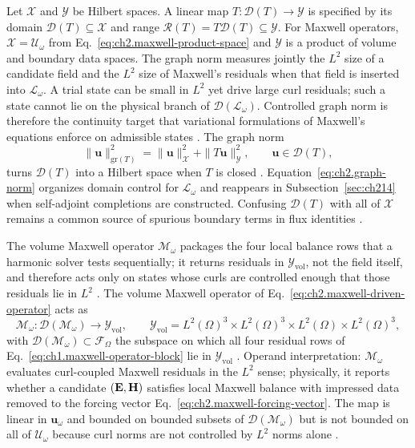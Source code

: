 Let \(\mathcal{X}\) and \(\mathcal{Y}\) be Hilbert spaces. A linear map \(T:\mathcal{D}(T)\to\mathcal{Y}\) is specified by its domain \(\mathcal{D}(T)\subseteq\mathcal{X}\) and range \(\mathcal{R}(T)=T\mathcal{D}(T)\subseteq\mathcal{Y}\). For Maxwell operators, \(\mathcal{X}=\mathcal{U}_\omega\) from Eq.~\eqref{eq:ch2.maxwell-product-space} and \(\mathcal{Y}\) is a product of volume and boundary data spaces. The graph norm measures jointly the \(L^{2}\) size of a candidate field and the \(L^{2}\) size of Maxwell's residuals when that field is inserted into \(\mathcal{L}_\omega\). A trial state can be small in \(L^{2}\) yet drive large curl residuals; such a state cannot lie on the physical branch of \(\mathcal{D}(\mathcal{L}_\omega)\). Controlled graph norm is therefore the continuity target that variational formulations of Maxwell's equations enforce on admissible states \cite{stratton1941,harrington2001}. The graph norm
\begin{equation}
\label{eq:ch2.graph-norm}
\|\mathbf{u}\|_{\mathrm{gr}(T)}^{2}
=
\|\mathbf{u}\|_{\mathcal{X}}^{2}+\|T\mathbf{u}\|_{\mathcal{Y}}^{2},
\qquad
\mathbf{u}\in\mathcal{D}(T),
\end{equation}
turns \(\mathcal{D}(T)\) into a Hilbert space when \(T\) is closed \cite{stratton1941}. Equation~\eqref{eq:ch2.graph-norm} organizes domain control for \(\mathcal{L}_\omega\) and reappears in Subsection~\ref{sec:ch214} when self-adjoint completions are constructed. Confusing \(\mathcal{D}(T)\) with all of \(\mathcal{X}\) remains a common source of spurious boundary terms in flux identities \cite{stratton1941}.

The volume Maxwell operator \(\mathcal{M}_\omega\) packages the four local balance rows that a harmonic solver tests sequentially; it returns residuals in \(\mathcal{Y}_{\mathrm{vol}}\), not the field itself, and therefore acts only on states whose curls are controlled enough that those residuals lie in \(L^{2}\) \cite{stratton1941}. The volume Maxwell operator of Eq.~\eqref{eq:ch2.maxwell-driven-operator} acts as
\begin{equation}
\label{eq:ch2.volume-operator-domain-range}
\mathcal{M}_\omega:\mathcal{D}(\mathcal{M}_\omega)\longrightarrow
\mathcal{Y}_{\mathrm{vol}},
\qquad
\mathcal{Y}_{\mathrm{vol}}=L^{2}(\Omega)^{3}\times L^{2}(\Omega)^{3}
\times L^{2}(\Omega)\times L^{2}(\Omega)^{3},
\end{equation}
with \(\mathcal{D}(\mathcal{M}_\omega)\subset\mathcal{F}_\Omega\) the subspace on which all four residual rows of Eq.~\eqref{eq:ch1.maxwell-operator-block} lie in \(\mathcal{Y}_{\mathrm{vol}}\) \cite{stratton1941}. Operand interpretation: \(\mathcal{M}_\omega\) evaluates curl-coupled Maxwell residuals in the \(L^{2}\) sense; physically, it reports whether a candidate \((\mathbf{E},\mathbf{H})\) satisfies local Maxwell balance with impressed data removed to the forcing vector Eq.~\eqref{eq:ch2.maxwell-forcing-vector}. The map is linear in \(\mathbf{u}_\omega\) and bounded on bounded subsets of \(\mathcal{D}(\mathcal{M}_\omega)\) but is not bounded on all of \(\mathcal{U}_\omega\) because curl norms are not controlled by \(L^{2}\) norms alone \cite{harrington2001}.

